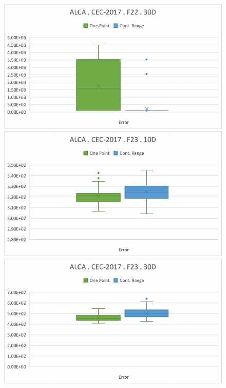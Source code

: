\documentclass[graybox]{svmult}
\begin{document}
\begin{figure}[!ht]
\begin{minipage}[h]{0.49\linewidth}
        \end{minipage}
        \hfill
        \begin{minipage}[h]{0.49\linewidth}
            \includegraphics[width=1\linewidth]{img/fig_experiment_F22x30D.pdf} 
        \end{minipage}
        \vfill
        \vspace{0.05 cm}
        \begin{minipage}[h]{0.49\linewidth}
            \includegraphics[width=1\linewidth]{img/fig_experiment_F23x10D.pdf} 
        \end{minipage}
        \hfill
        \begin{minipage}[h]{0.49\linewidth}
            \includegraphics[width=1\linewidth]{img/fig_experiment_F23x30D.pdf} 

\end{minipage}
\end{figure}
\end{document}
